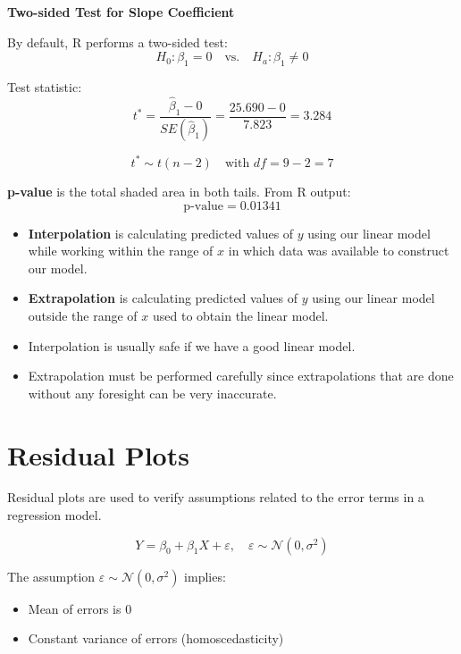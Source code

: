 \begin{example}
\textbf{Two-sided Test for Slope Coefficient}

By default, R performs a two-sided test:
\[
H_0: \beta_1 = 0 \quad \text{vs.} \quad H_a: \beta_1 \neq 0
\]

\vspace{0.3cm}

Test statistic:
\[
t^* = \frac{\hat{\beta}_1 - 0}{SE(\hat{\beta}_1)} = \frac{25.690 - 0}{7.823} = 3.284
\]

\[
t^* \sim t(n - 2) \quad \text{with } df = 9 - 2 = 7
\]

\vspace{0.5cm}

\textbf{p-value} is the total shaded area in both tails. From R output:
\[
\text{p-value} = 0.01341
\]

\end{example}
\begin{definition}
\vspace{-1em}
\begin{itemize}
    \item{\textbf{Interpolation}} is calculating predicted values of $y$ using our linear model while working within the range of $x$ in which data was available to construct our model.
    
    \item{\textbf{Extrapolation}} is calculating predicted values of $y$ using our linear model outside the range of $x$ used to obtain the linear model.
    
    \item Interpolation is usually safe if we have a good linear model.
    
    \item Extrapolation must be performed carefully since extrapolations that are done without any foresight can be very inaccurate.
\end{itemize}
\end{definition}
\section{Residual Plots}

Residual plots are used to verify assumptions related to the error terms in a regression model.

\[
Y = \beta_0 + \beta_1 X + \varepsilon, \quad \varepsilon \sim \mathcal{N}(0, \sigma^2)
\]

The assumption $\varepsilon \sim \mathcal{N}(0, \sigma^2)$ implies:
\begin{itemize}
    \item Mean of errors is 0
    \item Constant variance of errors (homoscedasticity)
\end{itemize}

